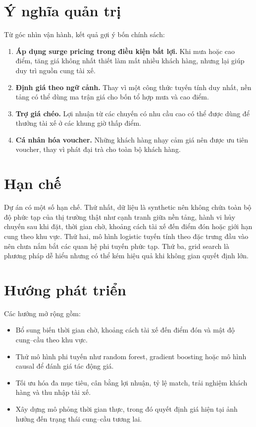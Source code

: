 \documentclass[12pt,a4paper]{report}
\begin{document}
\section{Ý nghĩa quản trị}

Từ góc nhìn vận hành, kết quả gợi ý bốn chính sách:

\begin{enumerate}
    \item \textbf{Áp dụng surge pricing trong điều kiện bất lợi.} Khi mưa hoặc cao điểm, tăng giá không nhất thiết làm mất nhiều khách hàng, nhưng lại giúp duy trì nguồn cung tài xế.
    \item \textbf{Định giá theo ngữ cảnh.} Thay vì một công thức tuyến tính duy nhất, nền tảng có thể dùng ma trận giá cho bốn tổ hợp mưa và cao điểm.
    \item \textbf{Trợ giá chéo.} Lợi nhuận từ các chuyến có nhu cầu cao có thể được dùng để thưởng tài xế ở các khung giờ thấp điểm.
    \item \textbf{Cá nhân hóa voucher.} Những khách hàng nhạy cảm giá nên được ưu tiên voucher, thay vì phát đại trà cho toàn bộ khách hàng.
\end{enumerate}

\section{Hạn chế}

Dự án có một số hạn chế. Thứ nhất, dữ liệu là synthetic nên không chứa toàn bộ độ phức tạp của thị trường thật như cạnh tranh giữa nền tảng, hành vi hủy chuyến sau khi đặt, thời gian chờ, khoảng cách tài xế đến điểm đón hoặc giới hạn cung theo khu vực. Thứ hai, mô hình logistic tuyến tính theo đặc trưng đầu vào nên chưa nắm bắt các quan hệ phi tuyến phức tạp. Thứ ba, grid search là phương pháp dễ hiểu nhưng có thể kém hiệu quả khi không gian quyết định lớn.

\section{Hướng phát triển}

Các hướng mở rộng gồm:

\begin{itemize}
    \item Bổ sung biến thời gian chờ, khoảng cách tài xế đến điểm đón và mật độ cung--cầu theo khu vực.
    \item Thử mô hình phi tuyến như random forest, gradient boosting hoặc mô hình causal để đánh giá tác động giá.
    \item Tối ưu hóa đa mục tiêu, cân bằng lợi nhuận, tỷ lệ match, trải nghiệm khách hàng và thu nhập tài xế.
    \item Xây dựng mô phỏng thời gian thực, trong đó quyết định giá hiện tại ảnh hưởng đến trạng thái cung--cầu tương lai.
\end{itemize}
\end{document}
